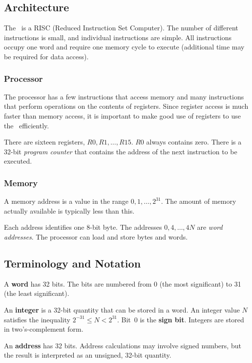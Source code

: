 \subsection{Architecture}

The \moon\ is a RISC (Reduced Instruction Set Computer). The number of
different instructions is small, and individual instructions are simple.
All instructions occupy one word and require one memory cycle to execute
(additional time may be required for data access).

\subsubsection{Processor}

The processor has a few instructions that access memory and many
instructions that perform operations on the contents of registers. Since
register access is much faster than memory access, it is important to
make good use of registers to use the \moon\ efficiently.

There are sixteen registers, $R0,R1,\ldots,R15$. $R0$ always contains
zero. There is a 32-bit {\it program counter\/} that contains the
address of the next instruction to be executed.

\subsubsection{Memory}

A memory address is a value in the range $0,1,\ldots,2^{31}$. The amount
of memory actually available is typically less than this.

Each address identifies one 8-bit byte. The addresses $0,4,\ldots,4N$
are {\it word addresses\/}. The processor can load and store bytes and
words.

\subsection{Terminology and Notation}

A {\bf word} has 32 bits. The bits are numbered from 0 (the most
significant) to 31 (the least significant).

An {\bf integer} is a 32-bit quantity that can be stored in a word.
An integer value $N$ satisfies the inequality $2^{-31} \le N < 2^{31}$.
Bit~0 is the {\bf sign bit}. Integers are stored in two's-complement
form.

An {\bf address} has 32 bits. Address calculations may involve signed
numbers, but the result is interpreted as an unsigned, 32-bit quantity.

